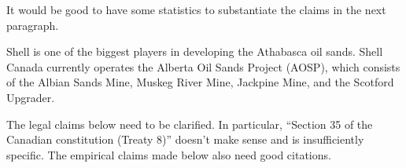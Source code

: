 \begin{vcom}
	It would be good to have some statistics to substantiate the claims in the next paragraph.
\end{vcom}

Shell is one of the biggest players in developing the Athabasca oil sands. 
Shell Canada currently operates the Alberta Oil Sands Project (AOSP), which consists of the Albian Sands Mine, Muskeg River Mine, Jackpine Mine, and the Scotford Upgrader. 

\begin{vcom}
	The legal claims below need to be clarified. In particular, ``Section 35 of the Canadian constitution (Treaty 8)'' doesn't make sense and is insufficiently specific. The empirical claims made below also need good citations.
\end{vcom}

